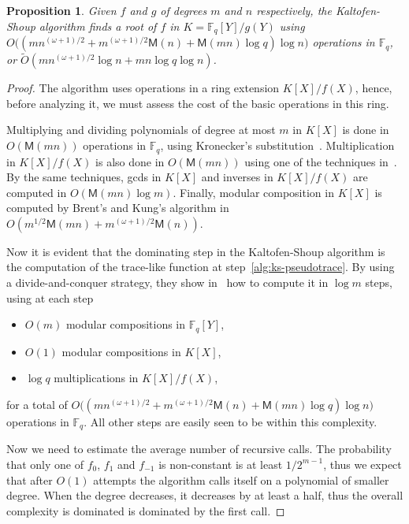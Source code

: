 \documentclass[12pt]{article}
\theoremstyle{plain}
\newtheorem{proposition}[theorem]{Proposition}
\theoremstyle{definition}
\newcommand{\tildO}{\tilde{O}}
\def\F{\ensuremath{\mathbb{F}}}
\def\MM{\ensuremath{\mathsf{M}}}
\newcounter{algorithm}
\begin{document}
\begin{proposition}
  Given $f$ and $g$ of degrees $m$ and $n$ respectively, the
  Kaltofen-Shoup algorithm finds a root of $f$ in $K=\F_q[Y]/g(Y)$
  using $O\bigl((mn^{(\omega+1)/2} + m^{(\omega+1)/2}\MM(n) +
  \MM(mn)\log q)\log n\bigr)$ operations in $\F_q$, or
  $\tildO(mn^{(\omega+1)/2}\log n + mn\log q\log n)$.
\end{proposition}
\begin{proof}
  The algorithm uses operations in a ring extension $K[X]/f(X)$,
  hence, before analyzing it, we must assess the cost of the basic
  operations in this ring.

  Multiplying and dividing polynomials of degree at most $m$ in $K[X]$
  is done in $O(\MM(mn))$ operations in $\F_q$, using Kronecker's
  substitution~\cite{moenck76,kaltofen87,vzGG,vzgathen+shoup92,harvey09}. Multiplication
  in $K[X]/f(X)$ is also done in $O(\MM(mn))$ using one of the
  techniques
  in~\cite{pascal+schost06,DeDoSc13,DeFeo:2014:FAA:2608628.2608672}. By
  the same techniques, gcds in $K[X]$ and inverses in $K[X]/f(X)$ are
  computed in $O(\MM(mn)\log m)$. Finally, modular composition in
  $K[X]$ is computed by Brent's and Kung's algorithm in $O(m^{1/2}\MM(mn) +
  m^{(\omega+1)/2}\MM(n))$.

  Now it is evident that the dominating step in the Kaltofen-Shoup
  algorithm is the computation of the trace-like function at
  step~\ref{alg:ks-pseudotrace}. By using a divide-and-conquer
  strategy, they show in~\cite{kaltofen+shoup97} how to compute it in
  $\log m$ steps, using at each step
  \begin{itemize}
  \item $O(m)$ modular compositions in $\F_q[Y]$,
  \item $O(1)$ modular compositions in $K[X]$,
  \item $\log q$ multiplications in $K[X]/f(X)$,
  \end{itemize}
  for a total of $O\bigl((mn^{(\omega+1)/2} + m^{(\omega+1)/2}\MM(n) +
  \MM(mn)\log q)\log n\bigr)$ operations in $\F_q$.  All other steps
  are easily seen to be within this complexity.

  Now we need to estimate the average number of recursive calls. The
  probability that only one of $f_0$, $f_1$ and $f_{-1}$ is
  non-constant is at least $1/2^{m-1}$, thus we expect that after
  $O(1)$ attempts the algorithm calls itself on a polynomial of
  smaller degree. When the degree decreases, it decreases by at least
  a half, thus the overall complexity is dominated is dominated by the
  first call.
\end{proof}
\end{document}
